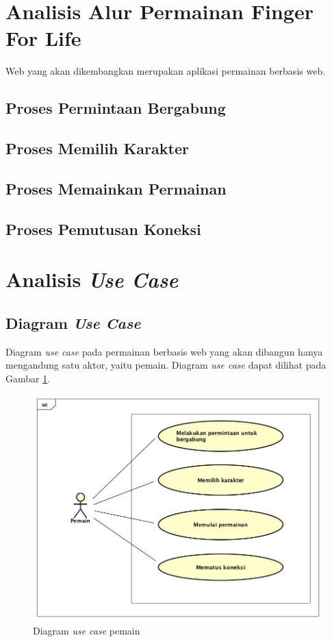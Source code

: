 \section{Analisis Alur Permainan Finger For Life}
\label{alur}

Web yang akan dikembangkan merupakan aplikasi permainan berbasis web.

\subsection{Proses Permintaan Bergabung}

\subsection{Proses Memilih Karakter}

\subsection{Proses Memainkan Permainan}

\subsection{Proses Pemutusan Koneksi}

\section{Analisis \textit{Use Case}}

\subsection{Diagram \textit{Use Case}}
\label{usecase}

Diagram \textit{use case} pada permainan berbasis web yang akan dibangun hanya mengandung satu aktor, yaitu pemain. Diagram \textit{use case} dapat dilihat pada Gambar \ref{fig:usecase_pemain}.

\begin{figure}[H]
	\centering
	\includegraphics[scale=0.4]{Gambar/usecase_pemain}
	\caption{Diagram \textit{use case} pemain}
	\label{fig:usecase_pemain}
\end{figure}

